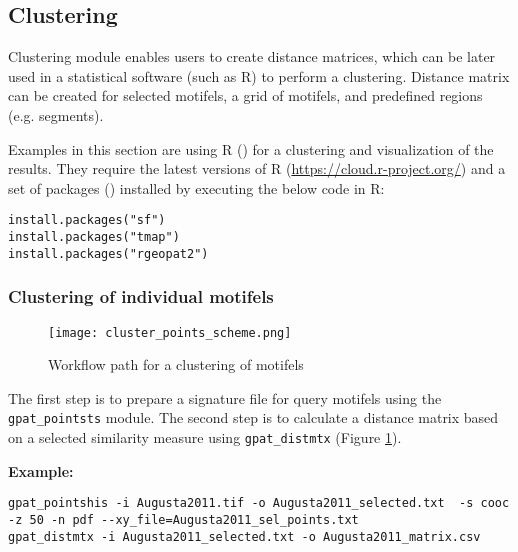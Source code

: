 \FloatBarrier

\subsection{Clustering \label{clustering}}

Clustering module enables users to create distance matrices, which can be later used in a statistical software (such as R) to perform a clustering.
Distance matrix can be created for selected motifels, a grid of motifels, and predefined regions (e.g. segments).

Examples in this section are using R (\cite{R}) for a clustering and visualization of the results. 
They require the latest versions of R (\url{https://cloud.r-project.org/}) and a set of packages (\cite{rsf,rtmap,rrgeopat2}) installed by executing the below code in R:

\begin{minipage}{\linewidth}
\begin{lstlisting}
install.packages("sf")
install.packages("tmap")
install.packages("rgeopat2")
\end{lstlisting}
\end{minipage}

\subsubsection{Clustering of individual motifels}

\begin{figure}[H]
	\centering
	\texttt{[image: cluster\_points\_scheme.png]}
	\caption{Workflow path for a clustering of motifels}
	\label{FIG:CLUSTER_POINTS}
\end{figure}

The first step is to prepare a signature file for query motifels using the {\tt gpat\_pointsts} module. 
The second step is to calculate a distance matrix based on a selected similarity measure using {\tt gpat\_distmtx} (Figure \ref{FIG:CLUSTER_POINTS}).

{\bf Example:}

\begin{minipage}{\linewidth}
\begin{lstlisting}
gpat_pointshis -i Augusta2011.tif -o Augusta2011_selected.txt  -s cooc -z 50 -n pdf --xy_file=Augusta2011_sel_points.txt
gpat_distmtx -i Augusta2011_selected.txt -o Augusta2011_matrix.csv
\end{lstlisting}
\end{minipage}

